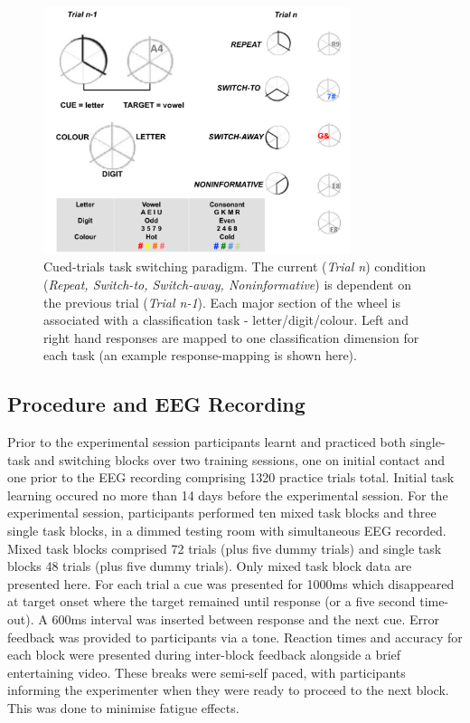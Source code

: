 \documentclass[preprint,authoryear,11pt,5p,times,twocolumns]{elsarticle}
\begin{document}
\begin{figure}[ht!]
\centering
\includegraphics[width=90mm]{Figure1.pdf}
\caption{Cued-trials task switching paradigm. The current (\emph{Trial n}) condition (\emph{Repeat, Switch-to, Switch-away, Noninformative}) is dependent on the previous trial (\emph{Trial n-1}). Each major section of the wheel is associated with a classification task - letter/digit/colour. Left and right hand responses are mapped to one classification dimension for each task (an example response-mapping is shown here).}
\label{Paradigm}
\end{figure}

\subsection{Procedure and EEG Recording}

Prior to the experimental session participants learnt and practiced both single-task and switching blocks over two training sessions, one on initial contact and one prior to the EEG recording comprising 1320 practice trials total. Initial task learning occured no more than 14 days before the experimental session. For the experimental session, participants performed ten mixed task blocks and three single task blocks, in a dimmed testing room with simultaneous EEG recorded. Mixed task blocks comprised 72 trials (plus five dummy trials) and single task blocks 48 trials (plus five dummy trials). Only mixed task block data are presented here. For each trial a cue was presented for 1000ms which
disappeared at target onset where the target remained until response (or a five second time-out). A 600ms interval was inserted between response and the next cue. Error feedback was provided to participants via a tone. Reaction times and accuracy for each block were presented during inter-block feedback alongside a brief entertaining video. These breaks were semi-self paced, with participants informing the experimenter when they were ready to proceed to the next block. This was done to minimise fatigue effects.
\end{document}
